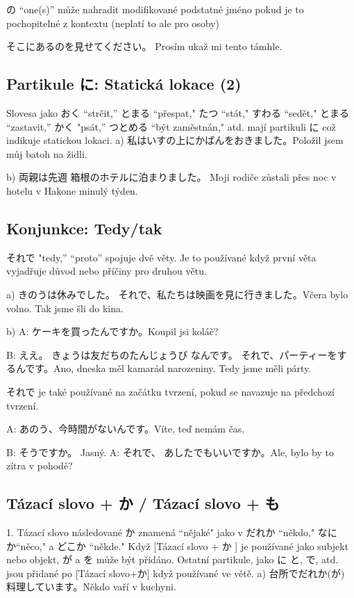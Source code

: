 の “one(s)” může nahradit modifikované podstatné jméno pokud je to pochopitelné z kontextu (neplatí to ale pro osoby)

そこにあるのを見せてください。 Prosím ukaž mi tento támhle.



\subsection{Partikule に: Statická lokace (2)}
Slovesa jako  おく “strčit,” とまる “přespat," たつ “stát," すわる “sedět," とまる
“zastavit,” かく "psát,” つとめる “být zaměstnán," atd. mají partikuli に což indikuje statickou lokaci.
a) 私はいすの上にかばんをおきました。Položil jsem můj batoh na židli.


b) 両親は先週 箱根のホテルに泊まりました。 Moji rodiče zůstali přes noc v hotelu v Hakone minulý týden.


\subsection{Konjunkce: Tedy/tak}
それで "tedy,” “proto” spojuje dvě věty. Je to používané když první věta vyjadřuje důvod nebo příčiny pro druhou větu.

a) きのうは休みでした。 それで、私たちは映画を見に行きました。Včera bylo volno. Tak jsme šli do kina.

b) A: ケーキを買ったんですか。Koupil jsi koláč?


B: ええ。 きょうは友だちのたんじょうび なんです。 それで、パーティーをするんです。Ano, dneska měl kamarád narozeniny. Tedy jsme měli párty.


それで je také používané na začátku tvrzení, pokud se navazuje na předchozí tvrzení.

A: あのう、今時間がないんです。Víte, teď nemám čas.

B: そうですか。 Jasný.
A: それで、 あしたでもいいですか。Ale, bylo by to zítra v pohodě?



\subsection{ Tázací slovo + か / Tázací slovo + も}
1. Tázací slovo následované  か znamená  “nějaké" jako v だれか “někdo," なにか“něco," a どこか “někde." Když  [Tázací slovo + か ] je používané jako subjekt nebo objekt, が a を může být přidáno. Ostatní partikule, jako に と, で, atd. jsou přidané po [Tázací slovo+か] když používané ve větě.
a) 台所でだれか(が) 料理しています。Někdo vaří v kuchyni.

